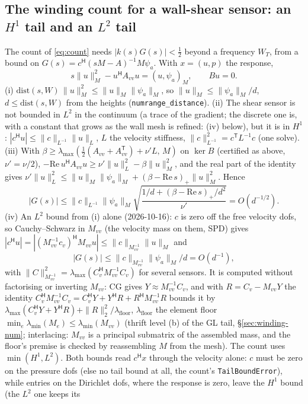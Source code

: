 \documentclass[11pt,a4paper]{article}
\newcommand{\code}[1]{\texttt{#1}}
\newcommand{\hp}{^{\mathsf H}}
\newcommand{\tp}{^{\mathsf T}}   %
\begin{document}
{\subsection{The winding count for a wall-shear sensor: an $H^1$ tail and an $L^2$ tail}
The count of \eqref{eq:count} needs $|k(s)G(s)|<\tfrac12$ beyond a frequency $W_T$, from a
bound on $G(s)=c\hp(sM-A)^{-1}M\psi_a$.  With $x=(u,p)$ the response,
\[
s\|u\|_M^2-u\hp A_{vv}u=(u,\psi_a)_M,\qquad Bu=0 .
\]
(i) $\mathrm{dist}(s,W)\,\|u\|_M^2\le\|u\|_M\|\psi_a\|_M$, so $\|u\|_M\le\|\psi_a\|_M/d$,
$d\le\mathrm{dist}(s,W)$ from the heights (\code{numrange\_distance}).  (ii) The shear sensor
is not bounded in $L^2$ in the continuum (a trace of the gradient; the discrete one is, with a
constant that grows as the wall mesh is refined: (iv) below), but it is in $H^1$:
$|c\hp u|\le\|c\|_{L^{-1}}\|u\|_L$, $L$ the velocity stiffness,
$\|c\|_{L^{-1}}^2=c\tp L^{-1}c$ (one solve).  (iii) With
$\beta\ge\lambda_{\max}(\tfrac12(A_{vv}+A_{vv}\tp)+\nu'L,\,M)$ on $\ker B$ (certified as above,
$\nu'=\nu/2$), $-\mathrm{Re}\,u\hp A_{vv}u\ge\nu'\|u\|_L^2-\beta\|u\|_M^2$, and the real part of
the identity gives $\nu'\|u\|_L^2\le\|u\|_M\|\psi_a\|_M+(\beta-\mathrm{Re}\,s)_+\|u\|_M^2$.  Hence
\[
|G(s)|\le\|c\|_{L^{-1}}\|\psi_a\|_M\sqrt{\frac{1/d+(\beta-\mathrm{Re}\,s)_+/d^2}{\nu'}}
=O(d^{-1/2}).
\]
(iv) An $L^2$ bound from (i) alone (2026-10-16): $c$ is zero off the free velocity dofs,
so Cauchy--Schwarz in $M_{vv}$ (the velocity mass on them, SPD) gives
$|c\hp u|=|(M_{vv}^{-1}c_v)\hp M_{vv}u|\le\|c\|_{M_{vv}^{-1}}\|u\|_M$ and
\[
|G(s)|\le\|c\|_{M_{vv}^{-1}}\|\psi_a\|_M/d=O(d^{-1}),
\]
with $\|C\|_{M_{vv}^{-1}}^2=\lambda_{\max}(C_v\hp M_{vv}^{-1}C_v)$ for several sensors.  It is
computed without factorising or inverting $M_{vv}$: CG gives $Y\approx M_{vv}^{-1}C_v$, and with
$R=C_v-M_{vv}Y$ the identity $C_v\hp M_{vv}^{-1}C_v=C_v\hp Y+Y\hp R+R\hp M_{vv}^{-1}R$ bounds it by
$\lambda_{\max}(C_v\hp Y+Y\hp R)+\|R\|_2^2/\lambda_{\mathrm{floor}}$, $\lambda_{\mathrm{floor}}$ the
element floor $\min_e\lambda_{\min}(M_e)\le\lambda_{\min}(M_{vv})$ (thrift level (b) of the GL tail,
\S\ref{sec:winding-num}; interlacing: $M_{vv}$ is a principal submatrix of the assembled mass,
and the floor's premise is checked by reassembling $M$ from the mesh).  The count uses
$\min(H^1, L^2)$.  Both bounds read $c\hp x$ through the velocity alone: $c$ must be zero on the
pressure dofs (else no tail bound at all, the count's \code{TailBoundError}), while entries on
the Dirichlet dofs, where the response is zero, leave the $H^1$ bound (the $L^2$ one keeps its
}
\end{document}

